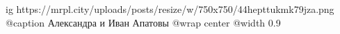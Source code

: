  
 
 
 
 

\ifcmt
  ig https://mrpl.city/uploads/posts/resize/w/750x750/44hepttukmk79jza.png
	@caption Александра и Иван Апатовы
  @wrap center
  @width 0.9
\fi
